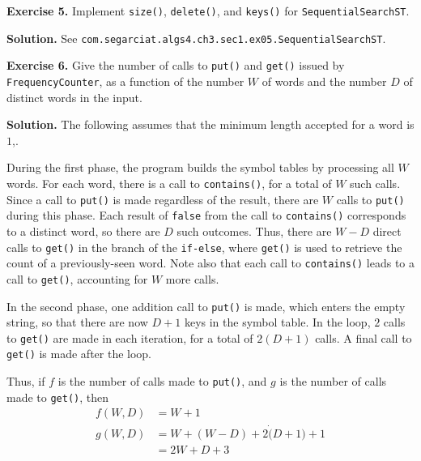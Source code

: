 \documentclass[12pt, a4paper]{article}
\newenvironment{ex}[2][Exercise]
{\par\medskip\noindent \textbf{#1 #2.}}
{\medskip}
\newenvironment{sol}[1][Solution]
{\par\medskip\noindent \textbf{#1.} }
{\medskip}
\begin{document}
	\begin{ex}{5}
		Implement \texttt{size()}, \texttt{delete()}, and \texttt{keys()} for
		\texttt{SequentialSearchST}.
	\end{ex}
	\begin{sol}
		See \texttt{com.segarciat.algs4.ch3.sec1.ex05.SequentialSearchST}.
	\end{sol}
	\begin{ex}{6}
		Give the number of calls to \texttt{put()} and \texttt{get()} issued by
		\texttt{FrequencyCounter}, as a function of the number $W$ of words and
		the number $D$ of distinct words in the input.
	\end{ex}
	\begin{sol}
		The following assumes that the minimum length accepted for a word is $1$,.
		
		During the first phase, the program builds the symbol tables by processing
		all $W$ words. For each word, there is a call to \texttt{contains()},
		for a total of $W$ such calls. Since a call to \texttt{put()} is made
		regardless of the result, there are $W$ calls to \texttt{put()} during
		this phase. Each result of \texttt{false} from the call to \texttt{contains()}
		corresponds to a distinct word, so there are $D$ such outcomes. Thus,
		there are $W-D$ direct calls to \texttt{get()} in the branch of the
		\texttt{if-else}, where \texttt{get()} is used to retrieve the count
		of a previously-seen word. Note also that each call to \texttt{contains()}
		leads to a call to \texttt{get()}, accounting for $W$ more calls.
		
		In the second phase, one addition call to \texttt{put()} is made, which enters the
		empty string, so that there are now $D+1$ keys in the symbol table.
		In the loop, $2$ calls to \texttt{get()} are made in each iteration, for
		a total of $2(D+1)$ calls. A final call to \texttt{get()} is made after the
		loop.
		
		Thus, if $f$ is the number of calls made to \texttt{put()}, and $g$
		is the number of calls made to \texttt{get()}, then
		\begin{align*}
			f(W, D) &= W + 1\\
			g(W, D) &= W + (W - D) + 2\dot (D+1)+1\\
			&=2W+D+3
		\end{align*}
	\end{sol}
	\pagebreak
	\printbibliography
\end{document}
